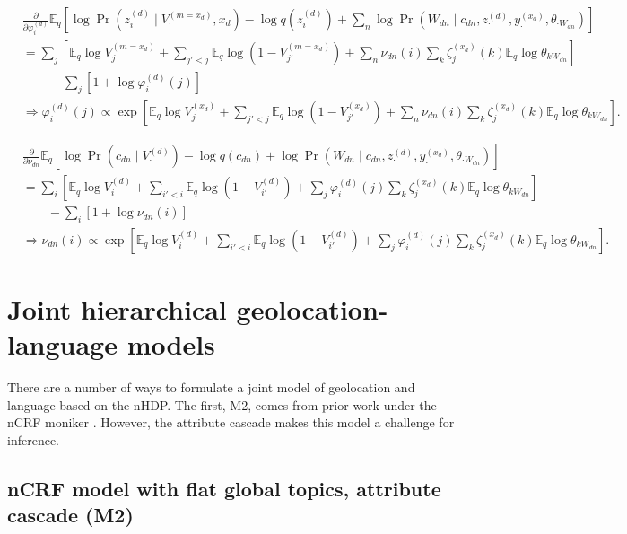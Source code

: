 \documentclass{article}
\newcommand{\Eq}{\ensuremath{\mathbb{E}_q\xspace}}
\newcommand{\pd}[1]{\ensuremath{\frac{\partial}{\partial #1}}}
\begin{document}
\begin{align*}
    &\pd{\varphi_i^{(d)}} \Eq \left[ \log \Pr(z_i^{(d)} \mid V^{(m=x_d)}_\cdot, x_d) - \log q(z_i^{(d)}) + \sum_n \log \Pr\left(W_{dn} \mid c_{dn}, z_\cdot^{(d)}, y_\cdot^{(x_d)}, \theta_{\cdot W_{dn}}\right) \right] \\
    &= \sum_j \left[ \Eq \log V_j^{(m=x_d)} + \sum_{j'<j} \Eq \log (1-V_{j'}^{(m=x_d)}) + \sum_n \nu_{dn}(i) \sum_k \zeta_j^{(x_d)}(k) \Eq \log \theta_{k W_{dn}} \right] \\
    &\qquad - \sum_j \left[ 1 + \log \varphi_i^{(d)}(j) \right] \\
    &\Rightarrow
    \boxed{ \varphi_i^{(d)}(j) \propto \exp\left[ \Eq \log V_j^{(x_d)} + \sum_{j'<j} \Eq \log (1-V_{j'}^{(x_d)}) + \sum_n \nu_{dn}(i) \sum_k \zeta_j^{(x_d)}(k) \Eq \log \theta_{k W_{dn}} \right] } .
\end{align*}

\begin{align*}
    &\pd{\nu_{dn}} \Eq \left[ \log \Pr(c_{dn} \mid V^{(d)}_\cdot) - \log q(c_{dn}) + \log \Pr\left(W_{dn} \mid c_{dn}, z_\cdot^{(d)}, y_\cdot^{(x_d)}, \theta_{\cdot W_{dn}}\right) \right] \\
    &= \sum_i \left[ \Eq \log V_i^{(d)} + \sum_{i'<i} \Eq \log (1-V_{i'}^{(d)}) + \sum_j \varphi_i^{(d)}(j) \sum_k \zeta_j^{(x_d)}(k) \Eq \log \theta_{k W_{dn}} \right] \\
    &\qquad - \sum_i \left[ 1 + \log \nu_{dn}(i) \right] \\
    &\Rightarrow
    \boxed{ \nu_{dn}(i) \propto \exp\left[ \Eq \log V_i^{(d)} + \sum_{i'<i} \Eq \log (1-V_{i'}^{(d)}) + \sum_j \varphi_i^{(d)}(j) \sum_k \zeta_j^{(x_d)}(k) \Eq \log \theta_{k W_{dn}} \right] } .
\end{align*}



\section*{Joint hierarchical geolocation-language models}

There are a number of ways to formulate a joint model of geolocation and language based on the nHDP.  The first, M2, comes from prior work under the nCRF moniker \cite{ahmed2013,ahmed2013a}.  However, the attribute cascade makes this model a challenge for inference.

\subsection*{nCRF model with flat global topics, attribute cascade (M2)}
\end{document}
